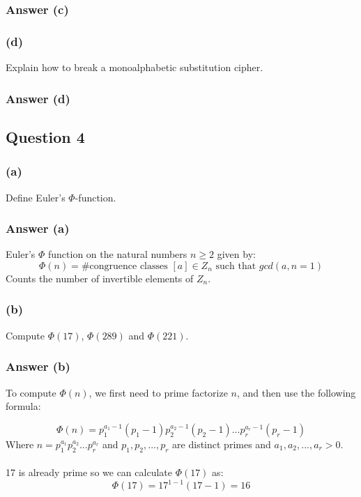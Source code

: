 \documentclass{article}
\begin{document}
	\subsubsection*{Answer (c)}
	
	
	\subsubsection*{(d)}
	 Explain how to break a monoalphabetic substitution cipher.
	
	\subsubsection*{Answer (d)}
	
	
	\subsection*{Question 4}
	\subsubsection*{(a)}
	Define Euler’s $\Phi$-function.
	
	\subsubsection*{Answer (a)}
	Euler's $\Phi$ function on the natural numbers $n \geq 2$ given by:
	$$
	\Phi(n) =  \text{\# congruence classes } [a] \in Z_n \text{ such that }gcd(a,n = 1)
	$$
	Counts the number of invertible elements of $Z_n$. 
	
	\subsubsection*{(b)}
	Compute $\Phi(17)$, $\Phi(289)$ and $\Phi(221)$.
	
	\subsubsection*{Answer (b)}
	To compute $\Phi(n)$, we first need to prime factorize $n$, and then use the following formula:

	$$
	\Phi(n) = p_{1}^{a_1-1}(p_1-1)p_{2}^{a_2-1}(p_2-1)...p_{r}^{a_r-1}(p_r-1)
	$$
	Where $n = p_{1}^{a_1}p_{2}^{a_2}...p_{r}^{a_r}$ and $p_1,p_2,...,p_r$ are distinct primes and $a_1,a_2,...,a_r > 0$. 
	\\\\
	17 is already prime so we can calculate $\Phi(17)$ as:
	$$
	\Phi(17) = 17^{1-1}(17-1) = 16
	$$
\end{document}
